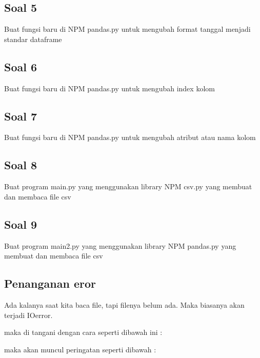 \subsection{Soal 5}
Buat fungsi baru di NPM pandas.py untuk mengubah format tanggal menjadi standar dataframe


\subsection{Soal 6}
Buat fungsi baru di NPM pandas.py untuk mengubah index kolom


\subsection{Soal 7}
Buat fungsi baru di NPM pandas.py untuk mengubah atribut atau nama kolom


\subsection{Soal 8}
Buat program main.py yang menggunakan library NPM csv.py yang membuat dan membaca file csv


\subsection{Soal 9}
Buat program main2.py yang menggunakan library NPM pandas.py yang membuat dan membaca file csv


\subsection{Penanganan eror}
Ada kalanya saat kita baca file, tapi filenya belum ada. Maka biasanya akan terjadi IOerror.

maka di tangani dengan cara seperti dibawah ini :

maka akan muncul peringatan seperti dibawah :




